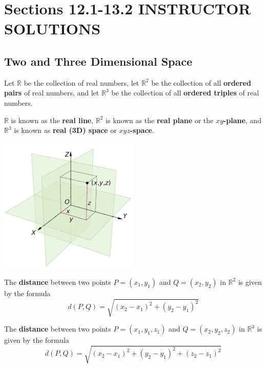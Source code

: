 \documentclass[letterpaper, twoside, 12pt]{book}
\begin{document}
\setcounter{chapter}{0}

\chapter{Sections 12.1-13.2 INSTRUCTOR SOLUTIONS}

\setcounter{chapter}{12}

\section{Two and Three Dimensional Space}

\begin{definition}
  Let $\mathbb{R}$ be the collection of real numbers, let $\mathbb{R}^2$ be the
  collection of all \textbf{ordered pairs} of real numbers, and let $\mathbb{R}^3$
  be the collection of all \textbf{ordered triples} of real numbers.

  $\mathbb{R}$ is known as the \textbf{real line}, $\mathbb{R}^2$ is known
  as the \textbf{real plane} or the \textbf{$xy$-plane}, and $\mathbb{R}^3$
  is known as \textbf{real (3D) space} or \textbf{$xyz$-space}.
\end{definition}

\begin{center}
  \includegraphics[width=0.5\textwidth]{assets/3dCoordinateSystem.pdf}
\end{center}

\begin{definition}
  The \textbf{distance} between two points $P=(x_1,y_1)$ and
  $Q=(x_2,y_2)$ in $\mathbb{R}^2$ is given by the formula
  \[
    d(P,Q) = \sqrt{(x_2-x_1)^2+(y_2-y_1)^2}
  \]

  The \textbf{distance} between two points $P=(x_1,y_1,z_1)$ and
  $Q=(x_2,y_2,z_2)$ in $\mathbb{R}^3$ is given by the formula
  \[
    d(P,Q) = \sqrt{(x_2-x_1)^2+(y_2-y_1)^2+(z_2-z_1)^2}
  \]
\end{definition}
\end{document}
